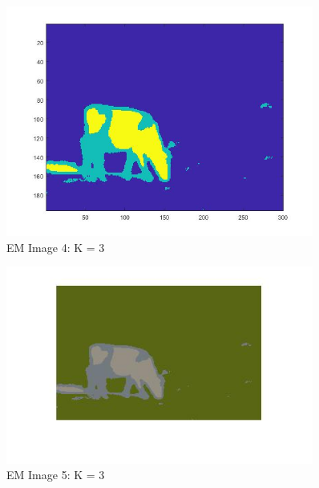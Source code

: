 \documentclass[12pt]{article}
\begin{document}
\vspace{5mm}
\begin{figure}[ht]
	\centering
	\includegraphics[width=0.9\textwidth]{k3_22a.jpg}
	\caption{EM Image 4: K = 3}
	\label{fig1}
\end{figure}
\vspace{5mm}
\begin{figure}[ht]
	\centering
	\includegraphics[width=0.9\textwidth]{k3_22b.jpg}
	\caption{EM Image 5: K = 3}
	\label{fig1}
\end{figure}
\vspace{5mm}
\end{document}
